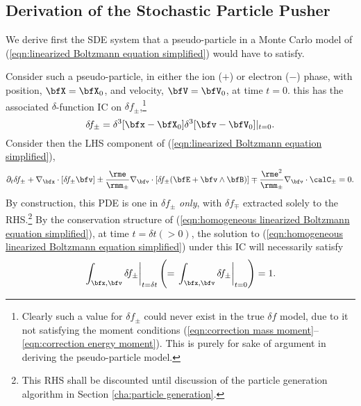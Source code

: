 \subsection{Derivation of the Stochastic Particle Pusher}\label{cha:particle pusher}
    We derive first the SDE system that a pseudo-particle in a Monte Carlo model of (\ref{eqn:linearized Boltzmann equation simplified}) would have to satisfy.


    Consider such a pseudo-particle, in either the ion ($+$) or electron ($-$) phase, with position, $\bfX  =  \bfX_{0}$, and velocity, $\bfV  =  \bfV_{0}$, at time $t  =  0$. this has the associated $\delta$-function IC on $\delta\!f_{\pm}$,\footnote{Clearly such a value for $\delta\!f_{\pm}$ could never exist in the true $\delta\!f$ model, due to it not satisfying the moment conditions (\ref{eqn:correction mass moment}--\ref{eqn:correction energy moment}). This is purely for sake of argument in deriving the pseudo-particle model.}
    \begin{equation}
        \delta\!f_{\pm}  =  \delta^{3}[\bfx - \bfX_{0}]\delta^{3}[\bfv - \bfV_{0}]|_{t = 0}.
    \end{equation}
    Consider then the LHS component of (\ref{eqn:linearized Boltzmann equation simplified}),
    \begin{equation}\label{eqn:homogeneous linearized Boltzmann equation simplified}
        \partial_{t}\delta\!f_{\pm} + \nabla_{\bfx}\cdot[\delta\!f_{\pm}\bfv] \pm \frac{\rme}{\rmm_{\pm}}\nabla_{\bfv}\cdot[\delta\!f_{\pm}(\bfE + \bfv\wedge\bfB)] \mp \frac{\rme^{2}}{\rmm_{\pm}}\nabla_{\bfv}\cdot\calC_{\pm}  =  0.
    \end{equation}
    By construction, this PDE is one in $\delta\!f_{\pm}$ \emph{only}, with $\delta\!f_{\mp}$ extracted solely to the RHS.\footnote{This RHS shall be discounted until discussion of the particle generation algorithm in Section \ref{cha:particle generation}.} By the conservation structure of (\ref{eqn:homogeneous linearized Boltzmann equation simplified}), at time $t = \delta t (> 0)$, the solution to (\ref{eqn:homogeneous linearized Boltzmann equation simplified}) under this IC will necessarily satisfy
    \begin{equation}
        \left.\int_{\bfx, \bfv}\delta\!f_{\pm}\right|_{t = \delta t}  \left(=  \left.\int_{\bfx, \bfv}\delta\!f_{\pm}\right|_{t = 0}\right)  =  1.
    \end{equation}
